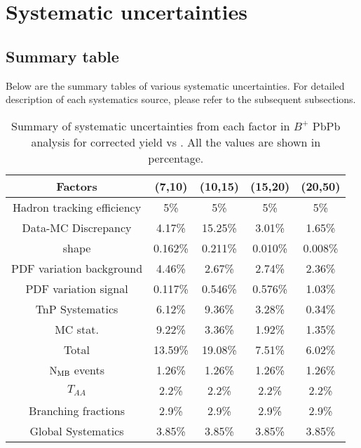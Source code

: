 \section {Systematic uncertainties}
\label{sec:systematic}

\subsection{Summary table}
Below are the summary tables of various systematic uncertainties. For detailed description of each systematics source, please refer to the subsequent subsections.

\begin{table}[h]
\begin{center}
\caption{Summary of systematic uncertainties from each factor in $B^+$ PbPb analysis for corrected yield vs \pt. All the values are shown in percentage.}
\vspace{1em}
\label{tab:sys_sum_Bu_PbPb}
  \begin{tabular}{ |c | c | c | c | c|}
    \hline
    Factors & (7,10) & (10,15) & (15,20) & (20,50)  \\
    \hline
    Hadron tracking efficiency & 5\% & 5\% & 5\% & 5\% \\
    Data-MC Discrepancy  & 4.17\%  & 15.25\%  & 3.01\% & 1.65\%  \\
	\pt shape &  0.162\% & 0.211\%  &  0.010\%& 0.008\%\\
    PDF variation background & 4.46\%  & 2.67\% & 2.74\%  & 2.36\% \\
    PDF variation signal & 0.117\%  & 0.546\%  & 0.576\% & 1.03\% \\
 TnP Systematics & 6.12\% & 9.36\% & 3.28\% & 0.34\% \\
	MC stat. & 9.22\% &  3.36\%  & 1.92\% & 1.35\% \\
Total  & 13.59\% &  19.08\% &  7.51\% & 6.02\%  \\

    \hline
    \hline
      $\rm{N_{MB}} $ events & 1.26\% & 1.26\% & 1.26\% & 1.26\% \\
    $T_{AA}$ & 2.2\% & 2.2\% & 2.2\% & 2.2\% \\
    Branching fractions & 2.9\% & 2.9\% & 2.9\%& 2.9\%\\
   Global Systematics & 3.85\% & 3.85\% & 3.85\%& 3.85\%\\  
    \hline
\end{tabular}
\end{center}
\end{table}


